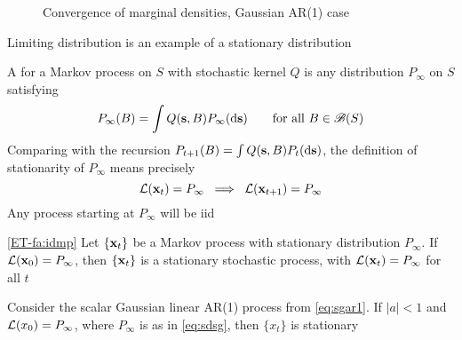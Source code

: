 \begin{frame}
 
    \begin{figure}
        \centering
        \caption{\label{f:long_norm_den_seq} Convergence of marginal densities, Gaussian AR(1) case}
    \end{figure}
 
\end{frame}

\begin{frame}

    \vspace{2em}
    Limiting distribution is an example of a stationary distribution 
    
    \vspace{1em}
    A  for a Markov process on $S$ with stochastic kernel
    $Q$ is any distribution $P_\infty$ on $S$ satisfying
    \begin{equation*}
        P_\infty(B) = \int Q({\mathbf s}, B) P_\infty(\mathop{}\!\mathrm{d} {\mathbf s})   
        \qquad \text{for all } B \in \mathscr B(S)
    \end{equation*}
    Comparing with the recursion $P_{t+1}(B) = \int Q({\mathbf s}, B) P_t(\mathop{}\!\mathrm{d} {\mathbf s})$,
    the definition of stationarity of $P_\infty$ means precisely 
    \begin{equation*}
    \mathcal L({\mathbf x}_t) = P_\infty
    \; \implies \; 
    \mathcal L({\mathbf x}_{t+1}) = P_\infty
    \end{equation*}
    Any process starting at $P_\infty$ will be {\sc iid}
    
\end{frame}

\begin{frame}

    \vspace{2em}
        \Fact\eqref{ET-fa:idmp} 
        Let $\{{\mathbf x}_t\}$ be a Markov process with stationary distribution
        $P_{\infty}$. If $\mathcal L({\mathbf x}_0) =  P_{\infty}$, then $\{{\mathbf x}_t\}$ is
        a stationary stochastic process, with $\mathcal L({\mathbf x}_t) = P_{\infty}$ for all $t$
    
    \vspace{1em}
    \Eg
        Consider the scalar Gaussian linear AR(1) process from \eqref{eq:sgar1}.
        If $|a| < 1$ and $\mathcal L(x_0) = P_\infty$, where $P_\infty$ is as in
        \eqref{eq:sdsg}, then $\{x_t\}$ is stationary
        
\end{frame}

